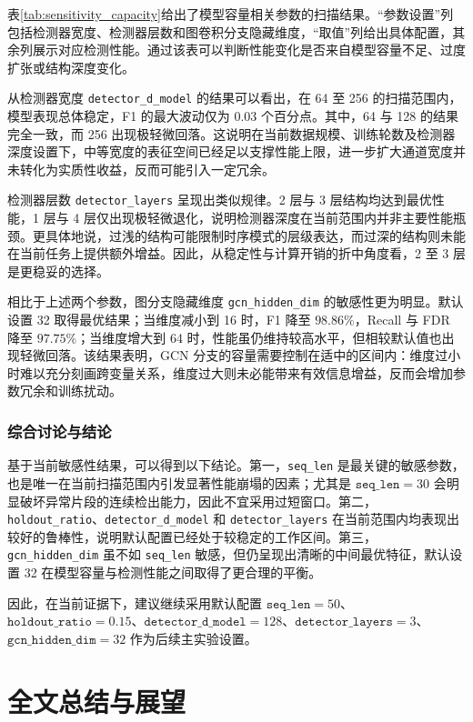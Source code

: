 \documentclass[bachelor, vlined]{DissertUESTC}
\begin{document}
    表\ref{tab:sensitivity_capacity}给出了模型容量相关参数的扫描结果。“参数设置”列包括检测器宽度、检测器层数和图卷积分支隐藏维度，“取值”列给出具体配置，其余列展示对应检测性能。通过该表可以判断性能变化是否来自模型容量不足、过度扩张或结构深度变化。

    从检测器宽度 \texttt{detector\_d\_model} 的结果可以看出，在 64 至 256 的扫描范围内，模型表现总体稳定，F1 的最大波动仅为 0.03 个百分点。其中，64 与 128 的结果完全一致，而 256 出现极轻微回落。这说明在当前数据规模、训练轮数及检测器深度设置下，中等宽度的表征空间已经足以支撑性能上限，进一步扩大通道宽度并未转化为实质性收益，反而可能引入一定冗余。

    检测器层数 \texttt{detector\_layers} 呈现出类似规律。2 层与 3 层结构均达到最优性能，1 层与 4 层仅出现极轻微退化，说明检测器深度在当前范围内并非主要性能瓶颈。更具体地说，过浅的结构可能限制时序模式的层级表达，而过深的结构则未能在当前任务上提供额外增益。因此，从稳定性与计算开销的折中角度看，2 至 3 层是更稳妥的选择。

    相比于上述两个参数，图分支隐藏维度 \texttt{gcn\_hidden\_dim} 的敏感性更为明显。默认设置 32 取得最优结果；当维度减小到 16 时，F1 降至 \(98.86\%\)，Recall 与 FDR 降至 \(97.75\%\)；当维度增大到 64 时，性能虽仍维持较高水平，但相较默认值也出现轻微回落。该结果表明，GCN 分支的容量需要控制在适中的区间内：维度过小时难以充分刻画跨变量关系，维度过大则未必能带来有效信息增益，反而会增加参数冗余和训练扰动。

    \subsection{综合讨论与结论}

    基于当前敏感性结果，可以得到以下结论。第一，\texttt{seq\_len} 是最关键的敏感参数，也是唯一在当前扫描范围内引发显著性能崩塌的因素；尤其是 \(\texttt{seq\_len}=30\) 会明显破坏异常片段的连续检出能力，因此不宜采用过短窗口。第二，\texttt{holdout\_ratio}、\texttt{detector\_d\_model} 和 \texttt{detector\_layers} 在当前范围内均表现出较好的鲁棒性，说明默认配置已经处于较稳定的工作区间。第三，\texttt{gcn\_hidden\_dim} 虽不如 \texttt{seq\_len} 敏感，但仍呈现出清晰的中间最优特征，默认设置 32 在模型容量与检测性能之间取得了更合理的平衡。

    因此，在当前证据下，建议继续采用默认配置 \(\texttt{seq\_len}=50\)、\(\texttt{holdout\_ratio}=0.15\)、\(\texttt{detector\_d\_model}=128\)、\(\texttt{detector\_layers}=3\)、\(\texttt{gcn\_hidden\_dim}=32\) 作为后续主实验设置。

	    \chapter{全文总结与展望}
\end{document}
